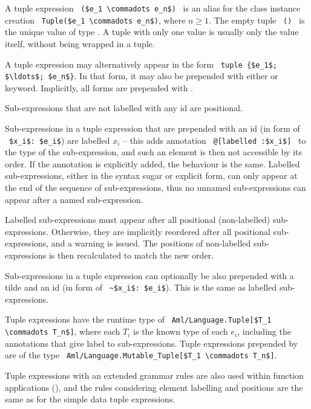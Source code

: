 A tuple expression ~\lstinline!($e_1 \commadots e_n$)!~ is an alias for the class instance creation ~\lstinline!Tuple($e_1 \commadots e_n$)!, where $n \geq 1$. The empty tuple ~\lstinline!()!~ is the unique value of type . A tuple with only one value is usually only the value itself, without being wrapped in a tuple.  

A tuple expression may alternatively appear in the form ~\lstinline!tuple {$e_1$; $\ldots$; $e_n$}!. In that form, it may also be prepended with either  or  keyword. Implicitly, all forms are prepended with . 

Sub-expressions that are not labelled with any id are positional. 

Sub-expressions in a tuple expression that are prepended with an id (in form of ~\lstinline!$x_i$: $e_i$!) are labelled $x_i$ -- this adds annotation ~\lstinline!@[labelled :$x_i$]!~ to the type of the sub-expression, and such an element is then not accessible by its order. If the annotation is explicitly added, the behaviour is the same. Labelled sub-expressions, either in the syntax sugar or explicit form, can only appear at the end of the sequence of sub-expressions, thus no unnamed sub-expressions can appear after a named sub-expression. 

Labelled sub-expressions must appear after all positional (non-labelled) sub-expressions. Otherwise, they are implicitly reordered after all positional sub-expressions, and a warning is issued. The positions of non-labelled sub-expressions is then recalculated to match the new order.

Sub-expressions in a tuple expression can optionally be also prepended with a tilde and an id (in form of ~\lstinline!~$x_i$: $e_i$!). This is the same as labelled sub-expressions. 

Tuple expressions have the runtime type of ~\lstinline!Aml/Language.Tuple[$T_1 \commadots T_n$]!, where each $T_i$ is the known type of each $e_i$, including the annotations that give label to sub-expressions. Tuple expressions prepended by  are of the type ~\lstinline!Aml/Language.Mutable_Tuple[$T_1 \commadots T_n$]!.

Tuple expressions with an extended grammar rules are also used within function applications (), and the rules considering element labelling and positions are the same as for the simple data tuple expressions. 

